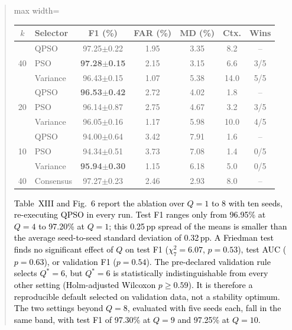 \documentclass[11pt]{article}
\newenvironment{excerpt}{\begin{quote}\sloppy}{\end{quote}}
\begin{document}
\begin{excerpt}
\begin{table}[H]
\color{red}
\setlength{\tabcolsep}{3pt}
\begin{adjustbox}{max width=\linewidth}
\begin{tabular}{clccccc}
\hline\toprule
$k$ & Selector & F1 (\%) & FAR (\%) & MD (\%) & Ctx. & Wins \\
\hline\toprule
\multirow{3}{*}{40} & QPSO & 97.25$\pm$0.22 & 1.95 & 3.35 & 8.2 & -- \\
 & PSO & \textbf{97.28$\pm$0.15} & 2.15 & 3.15 & 6.6 & 3/5 \\
 & Variance & 96.43$\pm$0.15 & 1.07 & 5.38 & 14.0 & 5/5 \\
\midrule
\multirow{3}{*}{20} & QPSO & \textbf{96.53$\pm$0.42} & 2.72 & 4.02 & 1.8 & -- \\
 & PSO & 96.14$\pm$0.87 & 2.75 & 4.67 & 3.2 & 3/5 \\
 & Variance & 96.05$\pm$0.16 & 1.17 & 5.98 & 10.0 & 4/5 \\
\midrule
\multirow{3}{*}{10} & QPSO & 94.00$\pm$0.64 & 3.42 & 7.91 & 1.6 & -- \\
 & PSO & 94.34$\pm$0.51 & 3.73 & 7.08 & 1.4 & 0/5 \\
 & Variance & \textbf{95.94$\pm$0.30} & 1.15 & 6.18 & 5.0 & 0/5 \\
\midrule
40 & Consensus & 97.27$\pm$0.23 & 2.46 & 2.93 & 8.0 & -- \\
\hline\toprule
\end{tabular}
\end{adjustbox}
\end{table}

\textcolor{black}{Table~XIII
and Fig.~6 report the ablation over $Q=1$ to 8 with
ten seeds, re-executing QPSO in every run. Test F1 ranges only from
96.95\% at $Q=4$ to 97.20\% at $Q=1$; this 0.25\,pp spread of the
means is smaller than the average seed-to-seed standard deviation of
0.32\,pp. A Friedman test finds no significant effect of $Q$ on test
F1 ($\chi^2_7=6.07$, $p=0.53$), test AUC ($p=0.63$), or validation F1
($p=0.54$). The pre-declared validation rule selects $Q^{*}=6$, but
$Q^{*}=6$ is statistically indistinguishable from every other setting
(Holm-adjusted Wilcoxon $p\ge0.59$). It is therefore a reproducible
default selected on validation data, not a stability optimum. The two
settings beyond $Q=8$, evaluated with five seeds each, fall in the same band,
with test F1 of 97.30\% at $Q=9$ and 97.25\% at $Q=10$.}

\setcounter{table}{12}
\begin{table}[H]
\centering
\caption{\textcolor{black}{Detection versus QPSO register size over ten seeds; last column: Holm-adjusted p-value against Q = 6.}}


\end{table}
\end{excerpt}
\end{document}
